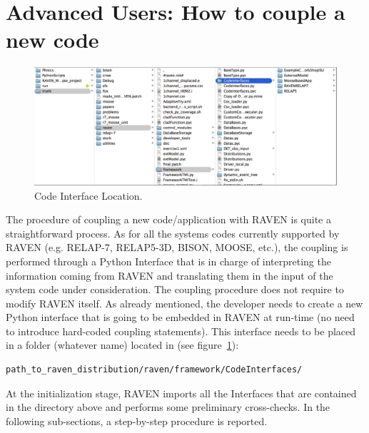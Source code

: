 \section{Advanced Users: How to couple a new code}
\label{sec:newCodeCoupling}
\begin{figure}
\centering
\includegraphics[width=1.0\textwidth]{pics/CodeInterfaceLocation.png}
\caption{Code Interface Location.}
\label{fig:codeinterface}
\end{figure}
The procedure of coupling a new code/application with RAVEN is quite a straightforward process. 
As for all the systems codes currently supported by RAVEN (e.g. RELAP-7, RELAP5-3D, 
BISON, MOOSE, etc.), the coupling is performed through a Python Interface that is in
 charge of interpreting the information coming from RAVEN and translating them in the
  input of the system code under consideration. 
The coupling procedure does not require to modify RAVEN itself. As already mentioned,
 the developer needs to create a new Python interface that is going to be embedded 
 in RAVEN at run-time (no need to introduce  hard-coded coupling statements). 
 This interface needs to be placed in a folder (whatever name) located in (see figure~\ref{fig:codeinterface}):
\begin{lstlisting}[language=bash]
 path_to_raven_distribution/raven/framework/CodeInterfaces/
\end{lstlisting}
At the initialization stage, RAVEN imports all the Interfaces that are contained in the directory above and performs some preliminary cross-checks.
In the following sub-sections, a step-by-step procedure is reported.
